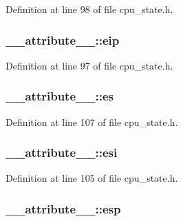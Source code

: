 \-Definition at line 98 of file cpu\-\_\-state.\-h.

\hypertarget{struct____attribute_____ad504112419baeb118523767d9ab592f4}{
\subsubsection[{eip}]{ {\bf \-\_\-\-\_\-attribute\-\_\-\-\_\-\-::eip}}}\label{struct____attribute_____ad504112419baeb118523767d9ab592f4}


\-Definition at line 97 of file cpu\-\_\-state.\-h.

\hypertarget{struct____attribute_____af8eb66ecff52556822543916e56f209f}{
\subsubsection[{es}]{ {\bf \-\_\-\-\_\-attribute\-\_\-\-\_\-\-::es}}}\label{struct____attribute_____af8eb66ecff52556822543916e56f209f}


\-Definition at line 107 of file cpu\-\_\-state.\-h.

\hypertarget{struct____attribute_____a2a5a201b9e29734ad6e4a1efc850e99f}{
\subsubsection[{esi}]{ {\bf \-\_\-\-\_\-attribute\-\_\-\-\_\-\-::esi}}}\label{struct____attribute_____a2a5a201b9e29734ad6e4a1efc850e99f}


\-Definition at line 105 of file cpu\-\_\-state.\-h.

\hypertarget{struct____attribute_____a72b01c88192dd7a4181b9a3e181df634}{
\subsubsection[{esp}]{ {\bf \-\_\-\-\_\-attribute\-\_\-\-\_\-\-::esp}}}\label{struct____attribute_____a72b01c88192dd7a4181b9a3e181df634}


